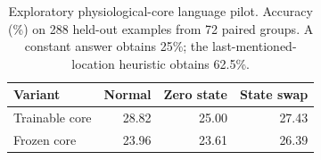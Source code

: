 \begin{table}[t]
\centering
\caption{Exploratory physiological-core language pilot. Accuracy (\%) on 288 held-out examples from 72 paired groups. A constant answer obtains 25\%; the last-mentioned-location heuristic obtains 62.5\%.}
\label{tab:physiology-pilot}
\begin{tabular}{lrrr}
\toprule
Variant & Normal & Zero state & State swap \\
\midrule
Trainable core & 28.82 & 25.00 & 27.43 \\
Frozen core & 23.96 & 23.61 & 26.39 \\
\bottomrule
\end{tabular}
\end{table}

